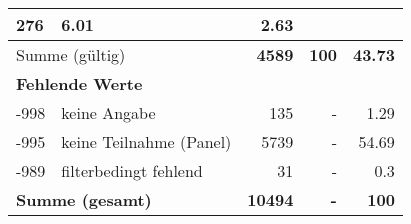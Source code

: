 \begin{longtable}{lXrrr}
       \num{276} &
       \num[round-mode=places,round-precision=2]{6.01} &
         \num[round-mode=places,round-precision=2]{2.63} \\
     \midrule
     \multicolumn{2}{l}{Summe (gültig)} &
       \textbf{\num{4589}} &
     \textbf{\num{100}} &
       \textbf{\num[round-mode=places,round-precision=2]{43.73}} \\
     \multicolumn{5}{l}{\textbf{Fehlende Werte}}\\
       -998 &
       keine Angabe &
         \num{135} &
        - &
         \num[round-mode=places,round-precision=2]{1.29} \\
       -995 &
       keine Teilnahme (Panel) &
         \num{5739} &
        - &
         \num[round-mode=places,round-precision=2]{54.69} \\
       -989 &
       filterbedingt fehlend &
         \num{31} &
        - &
         \num[round-mode=places,round-precision=2]{0.3} \\
     \midrule
     \multicolumn{2}{l}{\textbf{Summe (gesamt)}} &
          \textbf{\num{10494}} &
        \textbf{-} &
        \textbf{\num{100}} \\
     \bottomrule
     \end{longtable}
     
